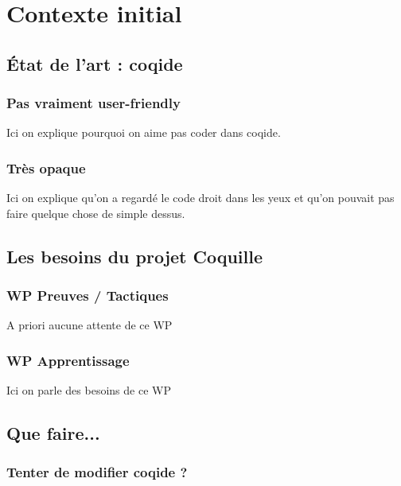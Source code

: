 \section{Contexte initial}

    \subsection{État de l'art : coqide}

        \subsubsection{Pas vraiment user-friendly}

            Ici on explique pourquoi on aime pas coder dans coqide.

        \subsubsection{Très opaque}

            Ici on explique qu'on a regardé le code droit dans les yeux et qu'on pouvait pas faire quelque chose de simple dessus.

    \subsection{Les besoins du projet Coquille}

        \subsubsection{WP Preuves / Tactiques}

            A priori aucune attente de ce WP

        \subsubsection{WP Apprentissage}

            Ici on parle des besoins de ce WP

    \subsection{Que faire...}

        \subsubsection{Tenter de modifier coqide ?}

